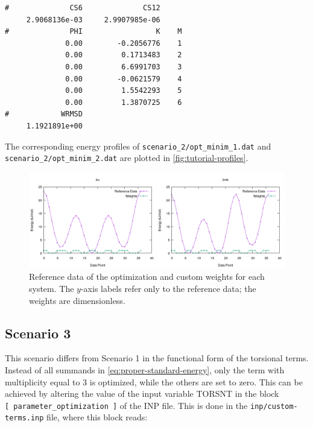 \documentclass[10pt,a4paper,openany]{memoir}
\numberwithin{equation}{section}
\newcommand{\under}{\_}
\begin{document}
\begin{lstlisting}
#              CS6              CS12
     2.9068136e-03     2.9907985e-06
#              PHI                 K    M
              0.00        -0.2056776    1
              0.00         0.1713483    2
              0.00         6.6991703    3
              0.00        -0.0621579    4
              0.00         1.5542293    5
              0.00         1.3870725    6
#            WRMSD
     1.1921891e+00
\end{lstlisting}\vspace{1ex}\par

\noindent The corresponding energy profiles of
\texttt{scenario\under{}2/opt\under{}minim\under{}1.dat} and
\texttt{scenario\under{}2/opt\under{}minim\under{}2.dat} are plotted
in \autoref{fig:tutorial-profiles}.

\begin{figure}[tb]
  \centering
  \includegraphics[width=\textwidth]{qm-and-weis}
  \caption{Reference data of the optimization and custom weights for
    each system. The $y$-axis labels refer only to the reference data;
    the weights are dimensionless.}
  \label{fig:qm-and-wei}
\end{figure}

\subsection{Scenario 3}
\label{sec:tutorial-scenario-3}

This scenario differs from Scenario 1 in the functional form of the
torsional terms.
%
Instead of all summands in \autoref{eq:proper-standard-energy}, only
the term with multiplicity equal to 3 is optimized, while the others
are set to zero.
%
This can be achieved by altering the value of the input variable
TORSNT in the block \texttt{[~parameter\under{}optimization~]} of the
INP file.
%
This is done in the \texttt{inp/custom-terms.inp} file, where this
block reads:
\end{document}
